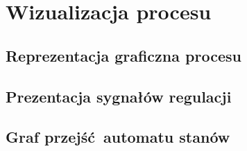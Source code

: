 \chapter{Wizualizacja procesu}
\label{inteco_wizualizacja}

\section{Reprezentacja graficzna procesu}
\label{inteco_wizualizacja_repr}

\section{Prezentacja sygnałów regulacji}
\label{inteco_wizualizacja_wykresy}

\section{Graf przejść automatu stanów}
\label{inteco_wizualizacja_automat}
